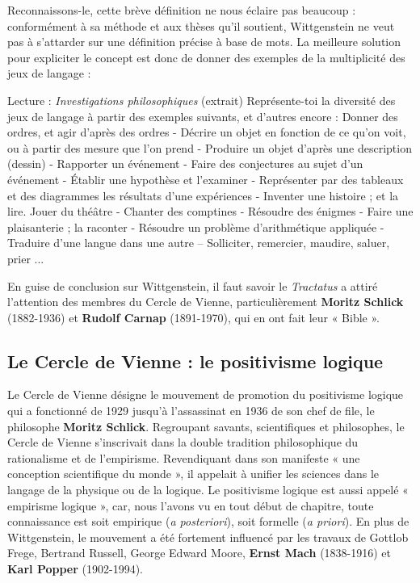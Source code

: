 Reconnaissons-le, cette brève définition ne nous éclaire pas beaucoup : conformément à sa méthode et aux thèses qu’il soutient, Wittgenstein ne veut pas à s’attarder sur une définition précise à base de mots. La meilleure solution pour expliciter le concept est donc de donner des exemples de la multiplicité des jeux de langage :

\begin{lecture}{Lecture : \textit{Investigations philosophiques} (extrait)}
Représente-toi la diversité des jeux de langage à partir des exemples suivants, et d’autres encore : Donner des ordres, et agir d’après des ordres - Décrire un objet en fonction de ce qu’on voit, ou à partir des mesure que l’on prend - Produire un objet d’après une description (dessin) - Rapporter un événement - Faire des conjectures au sujet d’un événement - Établir une hypothèse et l’examiner - Représenter par des tableaux et des diagrammes les résultats d’une expériences - Inventer une histoire ; et la lire. Jouer du théâtre - Chanter des comptines - Résoudre des énigmes - Faire une plaisanterie ; la raconter - Résoudre un problème d’arithmétique appliquée - Traduire d’une langue dans une autre – Solliciter, remercier, maudire, saluer, prier ...
\end{lecture}

En guise de conclusion sur Wittgenstein, il faut savoir le \textit{Tractatus} a attiré l’attention des membres du Cercle de Vienne, particulièrement \textbf{Moritz Schlick} (1882-1936) et \textbf{Rudolf Carnap} (1891-1970), qui en ont fait leur « Bible ».

\subsection{Le Cercle de Vienne : le positivisme logique}
Le Cercle de Vienne désigne le mouvement de promotion du positivisme logique qui a fonctionné de 1929 jusqu’à l’assassinat en 1936 de son chef de file, le philosophe \textbf{Moritz Schlick}. Regroupant savants, scientifiques et philosophes, le Cercle de Vienne s’inscrivait dans la double tradition philosophique du rationalisme et de l’empirisme. Revendiquant dans son manifeste « une conception scientifique du monde », il appelait à unifier les sciences dans le langage de la physique ou de la logique. Le positivisme logique est aussi appelé « empirisme logique », car, nous l’avons vu en tout début de chapitre, toute connaissance est soit empirique (\textit{a posteriori}), soit formelle (\textit{a priori}). En plus de Wittgenstein, le mouvement a été fortement influencé par les travaux de Gottlob Frege, Bertrand Russell, George Edward Moore, \textbf{Ernst Mach} (1838-1916) et \textbf{Karl Popper} (1902-1994).


